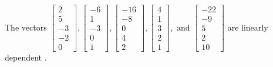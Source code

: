 \begin{exercise}
\begin{exerciseStatement}
  \end{exerciseStatement}
  \begin{exerciseAnswer}
   The vectors \(\left[\begin{array}{r}
2 \\
5 \\
-3 \\
-2 \\
0
\end{array}\right] , \left[\begin{array}{r}
-6 \\
1 \\
-3 \\
0 \\
1
\end{array}\right] , \left[\begin{array}{r}
-16 \\
-8 \\
0 \\
4 \\
2
\end{array}\right] , \left[\begin{array}{r}
4 \\
1 \\
3 \\
2 \\
1
\end{array}\right] , \text{ and } \left[\begin{array}{r}
-22 \\
-9 \\
5 \\
2 \\
10
\end{array}\right]\) are 
  	 linearly dependent  .
  


  \end{exerciseAnswer}
\end{exercise}